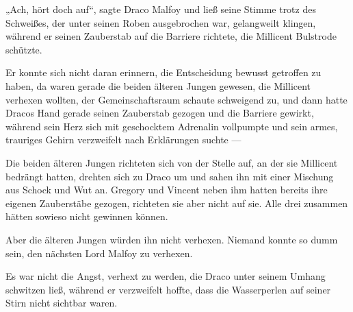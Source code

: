 „Ach, hört doch auf“, sagte Draco Malfoy und ließ seine Stimme trotz des Schweißes, der unter seinen Roben ausgebrochen war, gelangweilt klingen, während er seinen Zauberstab auf die Barriere richtete, die Millicent Bulstrode schützte.

Er konnte sich nicht daran erinnern, die Entscheidung bewusst getroffen zu haben, da waren gerade die beiden älteren Jungen gewesen, die Millicent verhexen wollten, der Gemeinschaftsraum schaute schweigend zu, und dann hatte Dracos Hand gerade seinen Zauberstab gezogen und die Barriere gewirkt, während sein Herz sich mit geschocktem Adrenalin vollpumpte und sein armes, trauriges Gehirn verzweifelt nach Erklärungen suchte —

Die beiden älteren Jungen richteten sich von der Stelle auf, an der sie Millicent bedrängt hatten, drehten sich zu Draco um und sahen ihn mit einer Mischung aus Schock und Wut an. Gregory und Vincent neben ihm hatten bereits ihre eigenen Zauberstäbe gezogen, richteten sie aber nicht auf sie. Alle drei zusammen hätten sowieso nicht gewinnen können.

Aber die älteren Jungen würden ihn nicht verhexen. Niemand konnte so dumm sein, den nächsten Lord Malfoy zu verhexen.

Es war nicht die Angst, verhext zu werden, die Draco unter seinem Umhang schwitzen ließ, während er verzweifelt hoffte, dass die Wasserperlen auf seiner Stirn nicht sichtbar waren.

